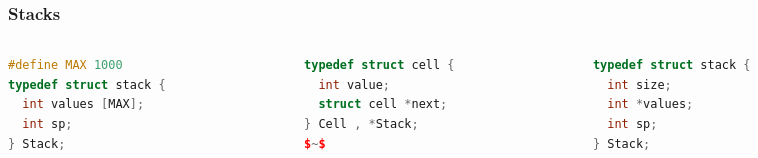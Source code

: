 \documentclass[aspectratio=169]{beamer}
\begin{document}
\begin{frame}[fragile]\frametitle{Stacks}

\begin{columns}
\begin{column}{.32\textwidth}
%
\begin{lstlisting}[language=C++, emph={stack,Stack}]
#define MAX 1000
typedef struct stack {
  int values [MAX];
  int sp;
} Stack;
\end{lstlisting}
%
\end{column}
\begin{column}{.32\textwidth}
%
\begin{lstlisting}[language=C++, emph={stack,Stack}]
typedef struct cell {
  int value;
  struct cell *next;
} Cell , *Stack;
$~$
\end{lstlisting}
%
\end{column}
\begin{column}{.32\textwidth}
%
\begin{lstlisting}[language=C++, emph={stack,Stack}]
typedef struct stack {
  int size;
  int *values;
  int sp;
} Stack;
\end{lstlisting}
%
\end{column}
\end{columns}
  




\end{frame}
\end{document}
